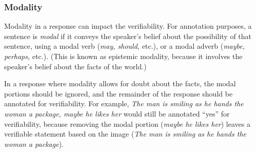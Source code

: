 \documentclass[12pt,notitlepage]{article}
\newcommand{\lk}[1]{\marginpar{\linespread{1}\scriptsize LK: #1}}
\begin{document}
%
%

\subsubsection{Modality} Modality in a response can impact the verifiability. For annotation purposes, a sentence is \textit{modal} if it conveys the speaker's belief about the possibility of that sentence, using a modal verb (\textit{may, should,} etc.), or a modal adverb (\textit{maybe, perhaps,} etc.). (This is known as epistemic modality, because it involves the speaker's belief about the facts of the world.)

In a response where modality allows for doubt about the facts, the modal portions should be ignored, and the remainder of the response should be annotated for verifiability. For example, \textit{The man is smiling as he hands the woman a package, maybe he likes her} would still be annotated ``yes'' for verifiability, because removing the modal portion (\textit{maybe he likes her}) leaves a verifiable statement based on the image (\textit{The man is smiling as he hands the woman a package}).
\end{document}

